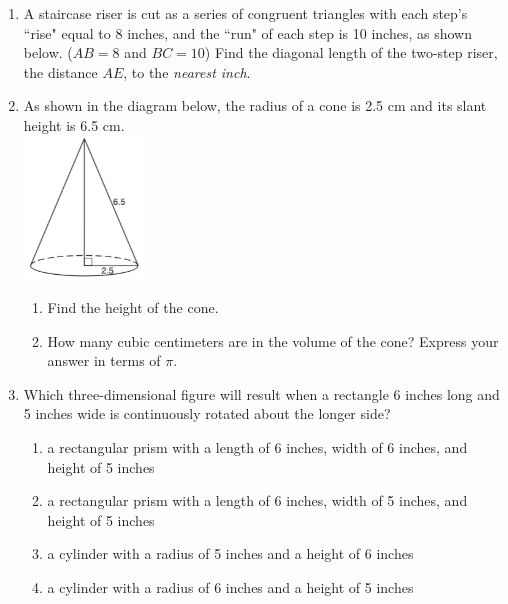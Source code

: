 \documentclass[12pt, twoside]{article}
\begin{document}
\begin{enumerate}
\newpage
  \item A staircase riser is cut as a series of congruent triangles with each step's ``rise" equal to 8 inches, and the ``run" of each step is 10 inches, as shown below. ($AB=8$ and $BC=10$) Find the diagonal length of the two-step riser, the distance $AE$, to the \emph{nearest inch}.\\[0.5cm]


   \item As shown in the diagram below, the radius of a cone is 2.5 cm and its slant height is 6.5 cm.\\[0.5cm]
     \includegraphics[width=0.25\textwidth]{cone_Jan2019-23.png}
     \begin{enumerate}
       \item Find the height of the cone. \vspace{2cm}
       \item How many cubic centimeters are in the volume of the cone? Express your answer in terms of $\pi$.
   \end{enumerate} \vspace{2.5cm}

\newpage
  \item Which three-dimensional figure will result when a rectangle 6 inches long and 5 inches wide is continuously rotated about the longer side?
    \begin{enumerate}
      \item a rectangular prism with a length of 6 inches, width of 6 inches, and height of 5 inches
      \item a rectangular prism with a length of 6 inches, width of 5 inches, and height of 5 inches
      \item a cylinder with a radius of 5 inches and a height of 6 inches
      \item a cylinder with a radius of 6 inches and a height of 5 inches
    \end{enumerate}


\end{enumerate}
\end{document}
